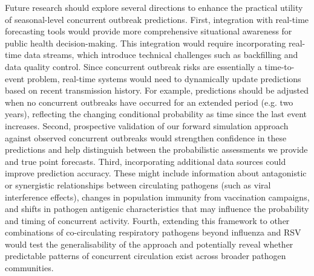 Future research should explore several directions to enhance the practical utility of seasonal-level concurrent outbreak predictions.
First, integration with real-time forecasting tools would provide more comprehensive situational awareness for public health decision-making.
This integration would require incorporating real-time data streams, which introduce technical challenges such as backfilling and data quality control.
Since concurrent outbreak risks are essentially a time-to-event problem, real-time systems would need to dynamically update predictions based on recent transmission history.
For example, predictions should be adjusted when no concurrent outbreaks have occurred for an extended period (e.g. two years), reflecting the changing conditional probability as time since the last event increases.
Second, prospective validation of our forward simulation approach against observed concurrent outbreaks would strengthen confidence in these predictions and help distinguish between the probabilistic assessments we provide and true point forecasts.
Third, incorporating additional data sources could improve prediction accuracy. These might include information about antagonistic or synergistic relationships between circulating pathogens (such as viral interference effects), changes in population immunity from vaccination campaigns, and shifts in pathogen antigenic characteristics that may influence the probability and timing of concurrent activity.
Fourth, extending this framework to other combinations of co-circulating respiratory pathogens beyond influenza and RSV would test the generalisability of the approach and potentially reveal whether predictable patterns of concurrent circulation exist across broader pathogen communities.



